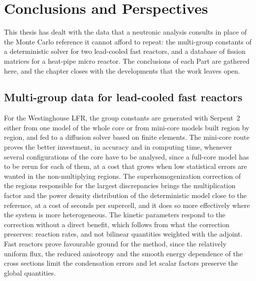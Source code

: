 
\chapter{Conclusions and Perspectives}\label{ch:conclusions}

This thesis has dealt with the data that a neutronic analysis consults in
place of the Monte Carlo reference it cannot afford to repeat: the multi-group
constants of a deterministic solver for
two lead-cooled fast reactors, and a database of fission matrices for a
heat-pipe micro reactor. The conclusions of each Part are gathered here, and
the chapter closes with the developments that the work leaves open.

\section{Multi-group data for lead-cooled fast reactors}

For the Westinghouse LFR, the group constants are generated with Serpent~2
either from one model of the whole core or from mini-core models built region
by region, and fed to a diffusion solver based on finite elements. The mini-core route proves the better investment, in accuracy
and in computing time, whenever several configurations of the core have to be
analysed, since a full-core model has to be rerun for each of them, at a cost
that grows when low statistical errors are wanted in the non-multiplying
regions. The superhomogenization correction of the regions responsible for the
largest discrepancies brings the multiplication factor and the power density
distribution of the deterministic model close to the reference, at a cost of
seconds per supercell, and it does so more effectively where the system is more
heterogeneous. The kinetic parameters respond to the correction without a
direct benefit, which follows from what the correction preserves: reaction
rates, and not bilinear quantities weighted with the adjoint. Fast reactors prove favourable ground for the
method, since the relatively uniform flux, the reduced anisotropy and the
smooth energy dependence of the cross sections limit the condensation errors
and let scalar factors preserve the global quantities.

